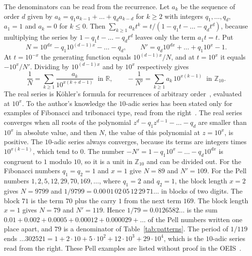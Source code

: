 \documentclass[11pt,a4paper]{amsart}
\theoremstyle{definition}
\theoremstyle{remark}
\newcommand{\Ztena}{\mathbb{Z}_{10}}
\begin{document}
The denominators can be read from the recurrence. Let $a_k$ be the sequence
of order $d$ given by $a_k = q_1 a_{k-1} + \dots + q_d a_{k-d}$ for $k \ge 2$
with integers $q_1, \dots, q_d$, $a_1 = 1$ and $a_k = 0$ for $k \le 0$. Then
$\sum_{k\ge1} a_k t^k = t/(1 - q_1 t - \dots - q_d t^d)$, because multiplying
the series by $1 - q_1 t - \dots - q_d t^d$ leaves only the term $a_1 t = t$.
Put
\begin{equation}\label{eq:recden}
N = 10^{dx} - q_1 10^{(d-1)x} - \dots - q_d ,
\qquad
N' = q_d 10^{dx} + \dots + q_1 10^{x} - 1 .
\end{equation}
At $t = 10^{-x}$ the generating function equals $10^{(d-1)x}/N$, and at
$t = 10^x$ it equals $-10^x/N'$. Dividing by $10^{(d-1)x}$ and by $10^x$
respectively gives
\begin{equation}\label{eq:recseries}
\frac1N = \sum_{k\ge1} \frac{a_k}{10^{x(k+d-1)}} \ \text{ in } \mathbb{R},
\qquad
-\frac1{N'} = \sum_{k\ge1} a_k\, 10^{x(k-1)} \ \text{ in } \Ztena .
\end{equation}
The real series is K\"ohler's formula for recurrences of arbitrary
order~\cite{kohler1985}, evaluated at $10^x$. To the author's knowledge the
$10$-adic series has been stated only for examples of Fibonacci and tribonacci
type, read from the right~\cite{bicknell1989}. The real series converges when
all roots of the polynomial $z^d - q_1 z^{d-1} - \dots - q_d$ are smaller than
$10^x$ in absolute value, and then $N$, the value of this polynomial at
$z = 10^x$, is positive. The $10$-adic series always converges, because its
terms are integers times $10^{x(k-1)}$, which tend to $0$. The number
$-N' = 1 - q_1 10^x - \dots - q_d 10^{dx}$ is congruent to $1$ modulo $10$, so
it is a unit in $\Ztena$ and can be divided out. For the Fibonacci numbers
$q_1 = q_2 = 1$ and $x = 1$ give $N = 89$ and $N' = 109$. For the Pell numbers
$1, 2, 5, 12, 29, 70, 169, \dots$, where $q_1 = 2$ and $q_2 = 1$, the block
length $x = 2$ gives $N = 9799$ and
$1/9799 = 0.00\,01\,02\,05\,12\,29\,71\dots$ in blocks of two digits. The block
$71$ is the term $70$ plus the carry $1$ from the next term $169$. The block
length $x = 1$ gives $N = 79$ and $N' = 119$. Hence $1/79 = 0.0126582\dots$ is
the sum $0.01 + 0.002 + 0.0005 + 0.00012 + 0.000029 + \dots$ of the Pell
numbers written one place apart, and $79$ is a denominator of
Table~\ref{tab:patterns}. The period of $1/119$ ends
$\dots 302521 = 1 + 2\cdot 10 + 5\cdot 10^2 + 12\cdot 10^3 + 29\cdot 10^4$,
which is the $10$-adic series read from the right.
These Pell examples are listed without proof in the OEIS~\cite{oeisA000129}.
\end{document}
